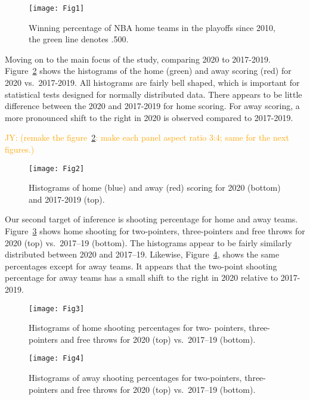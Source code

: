 \documentclass[10pt]{article}
\newcommand{\jy}[1]{\textcolor{orange}{JY: (#1)}}
\begin{document}
\begin{figure}[tbp]
  \centering
  \texttt{[image: Fig1]}
  \caption{Winning percentage of NBA home teams in the playoffs since
    2010, the green line denotes .500.}
  \label{fig:Fig1}
\end{figure}

Moving on to the main focus of the study, comparing 2020 to 2017-2019.
Figure~\ref{fig:Fig2} shows the histograms of the home (green) and
away scoring (red) for 2020 vs.~2017-2019. All histograms are
fairly bell shaped, which is important for statistical tests
designed for normally distributed data. There appears to be little
difference between the 2020 and 2017-2019 for home scoring. For
away scoring, a more pronounced shift to the right in 2020 is observed
compared to 2017-2019.


\jy{remake the figure~\ref{fig:Fig2}: make each panel aspect ratio 3:4; same for the
  next figures.}

\begin{figure}[tbp]
  \centering
  \texttt{[image: Fig2]}
  \caption{Histograms of home (blue) and away (red) scoring
    for 2020 (bottom) and 2017-2019 (top).}
  \label{fig:Fig2}
\end{figure}

Our second target of inference is shooting percentage for home and away teams.
Figure~\ref{fig:Fig3} shows home shooting for two-pointers, three-pointers and
free throws for 2020 (top) vs.~2017--19 (bottom). The histograms appear to be fairly
similarly distributed between 2020 and 2017--19. Likewise, Figure~\ref{fig:Fig4},
shows the same percentages except for away teams. It appears that the
two-point shooting percentage for away teams has a small shift to the
right in 2020 relative to 2017-2019.




\begin{figure}[tbp]
  \centering
  \texttt{[image: Fig3]}
  \caption{Histograms of home shooting percentages for two-
    pointers, three-pointers and free throws for 2020 (top) vs.~2017--19
    (bottom).}
  \label{fig:Fig3}
\end{figure}




\begin{figure}[tbp]
  \centering
  \texttt{[image: Fig4]}
  \caption{Histograms of away shooting percentages for two-pointers,
    three-pointers and free throws for 2020 (top) vs.~2017--19
    (bottom).}
  \label{fig:Fig4}  
\end{figure}
\end{document}
